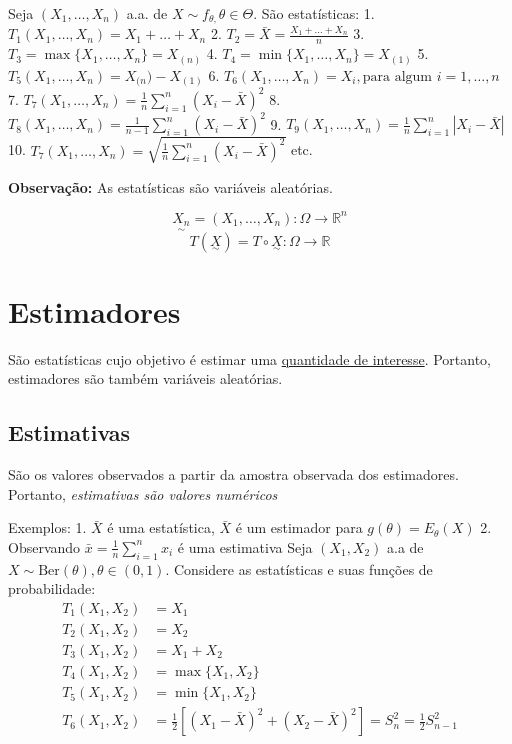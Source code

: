 \documentclass[
  letterpaper,
  DIV=11,
  numbers=noendperiod]{scrreprt}
\begin{document}
Seja \((X_{1}, \dots, X_{n})\) a.a. de
\(X\sim f_{\theta,}\theta \in \Theta\). São estatísticas: 1.
\(T_{1}(X_{1},\dots,X_{n})=X_{1}+\dots+X_{n}\) 2.
\(T_{2}=\bar{X}= \frac{X_{1}+\dots+X_{n}}{n}\) 3.
\(T_{3}=\max\{X_{1},\dots,X_{n}\}=X_{(n)}\) 4.
\(T_{4}=\min\{X_{1},\dots,X_{n}\}=X_{(1)}\) 5.
\(T_{5}(X_{1},\dots,X_{n})=X_{(n})-X_{(1)}\) 6.
\(T_{6}(X_{1},\dots,X_{n})=X_{i}, \text{para algum }i=1,\dots,n\) 7.
\(T_{7}(X_{1},\dots,X_{n})=\frac{1}{n}\sum\limits^{n}_{i=1}(X_{i}-\bar{X})^{2}\)
8.
\(T_{8}(X_{1},\dots,X_{n})=\frac{1}{n-1}\sum\limits^{n}_{i=1}(X_{i}-\bar{X})^{2}\)
9.
\(T_{9}(X_{1},\dots,X_{n})=\frac{1}{n}\sum\limits^{n}_{i=1}|X_{i}-\bar{X}|\)
10.
\(T_{7}(X_{1},\dots,X_{n})=\sqrt{\frac{1}{n}\sum\limits^{n}_{i=1}(X_{i}-\bar{X})^{2}}\)
etc.

\textbf{Observação:} As estatísticas são variáveis aleatórias.

\[
\underset{\sim}{X_n}=(X_{1},\dots,X_{n}):\Omega\rightarrow \mathbb{R}^{n}
\] \[
T(\underset{\sim}{X})=T \circ \underset{\sim}{X}:\Omega\rightarrow \mathbb{R}
\]


\chapter{Estimadores}\label{estimadores}

São estatísticas cujo objetivo é estimar uma
\href{quantidade-de-interesse.qmd}{quantidade de interesse}. Portanto,
estimadores são também variáveis aleatórias.

\section{Estimativas}\label{estimativas}

São os valores observados a partir da amostra observada dos estimadores.
Portanto, \emph{estimativas são valores numéricos}

Exemplos: 1. \(\bar{X}\) é uma estatística, \(\bar{X}\) é um estimador
para \(g(\theta)=E_\theta(X)\) 2. Observando
\(\bar{x}=\frac{1}{n} \sum\limits^{n}_{i=1}x_{i}\) é uma estimativa Seja
\((X_{1},X_{2})\) a.a de \(X\sim \text{Ber}(\theta), \theta \in (0,1)\).
Considere as estatísticas e suas funções de probabilidade: \[
\begin{aligned}
T_{1}(X_{1},X_{2}) &= X_{1}\\
T_{2}(X_{1},X_{2}) &= X_{2}\\
T_{3}(X_{1},X_{2}) &= X_{1}+X_{2}\\
T_{4}(X_{1},X_{2}) &= \max\{X_{1},X_{2}\}\\
T_{5}(X_{1},X_{2}) &= \min\{X_{1},X_{2}\}\\
T_{6}(X_{1},X_{2}) &= \frac{1}{2}[(X_{1}-\bar{X})^{2}+(X_{2}-\bar{X})^{2}]=S^{2}_{n}=\frac{1}{2}S_{n-1}^{2}
\end{aligned}
\]
\end{document}
